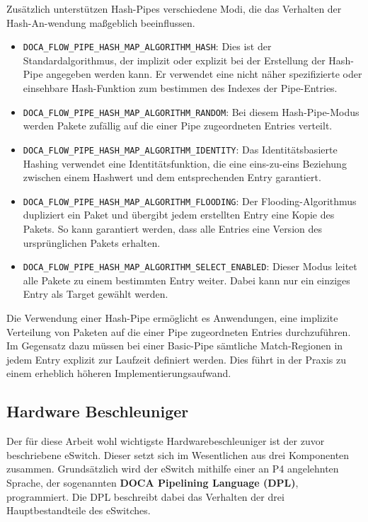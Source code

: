 \documentclass[paper=a4, fontsize=11pt]{scrartcl} %
\numberwithin{equation}{section} %
\numberwithin{figure}{section} %
\numberwithin{table}{section} %
\begin{document}
Zusätzlich unterstützen Hash-Pipes verschiedene Modi, die das Verhalten der Hash-An-wendung maßgeblich beeinflussen.
\begin{itemize}
    \item \texttt{DOCA\_FLOW\_PIPE\_HASH\_MAP\_ALGORITHM\_HASH}: Dies ist der Standardalgorithmus, der implizit oder explizit bei der Erstellung der Hash-Pipe angegeben werden kann. Er verwendet eine nicht näher spezifizierte oder einsehbare Hash-Funktion zum bestimmen des Indexes der Pipe-Entries. 
    \item \texttt{DOCA\_FLOW\_PIPE\_HASH\_MAP\_ALGORITHM\_RANDOM}: Bei diesem Hash-Pipe-Modus werden Pakete zufällig auf die einer Pipe zugeordneten Entries verteilt.
    \item \texttt{DOCA\_FLOW\_PIPE\_HASH\_MAP\_ALGORITHM\_IDENTITY}: Das Identitätsbasierte Hashing verwendet eine Identitätsfunktion, die eine eins-zu-eins Beziehung zwischen einem Hashwert und dem entsprechenden Entry garantiert.
    \item \texttt{DOCA\_FLOW\_PIPE\_HASH\_MAP\_ALGORITHM\_FLOODING}: Der Flooding-Algorithmus dupliziert ein Paket und übergibt jedem erstellten Entry eine Kopie des Pakets. So kann garantiert werden, dass alle Entries eine Version des ursprünglichen Pakets erhalten.
    \item \texttt{DOCA\_FLOW\_PIPE\_HASH\_MAP\_ALGORITHM\_SELECT\_ENABLED}: Dieser Modus leitet alle Pakete zu einem bestimmten Entry weiter. Dabei kann nur ein einziges Entry als Target gewählt werden.
\end{itemize}
Die Verwendung einer Hash-Pipe ermöglicht es Anwendungen, eine implizite Verteilung von Paketen auf die einer Pipe zugeordneten Entries durchzuführen. Im Gegensatz dazu müssen bei einer Basic-Pipe sämtliche Match-Regionen in jedem Entry explizit zur Laufzeit definiert werden. Dies führt in der Praxis zu einem erheblich höheren Implementierungsaufwand.
\subsection{Hardware Beschleuniger}
Der für diese Arbeit wohl wichtigste Hardwarebeschleuniger ist der zuvor beschriebene eSwitch. Dieser setzt sich im Wesentlichen aus drei Komponenten zusammen. Grundsätzlich wird der eSwitch mithilfe einer an P4 angelehnten Sprache, der sogenannten \textbf{DOCA Pipelining Language (DPL)}, programmiert. Die DPL beschreibt dabei das Verhalten der drei Hauptbestandteile des eSwitches.
\end{document}
